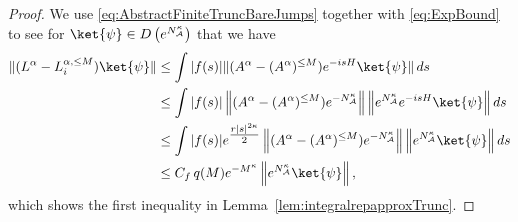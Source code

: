 \documentclass[11pt]{amsart}
\newcommand{\nn}{\nonumber}
\newcommand{\1}{\mathbbm{1}}
\newcommand{\NA}{N_{\mathcal{A}}}
\newcommand{\bin}[1]{}
\theoremstyle{plain}
\theoremstyle{definition}
\theoremstyle{remark}
\numberwithin{equation}{section}
\begin{document}
\begin{proof}

\bin{First of all note that for $i=1,\cdots, m$ we have that $N_i$ and $\NA$ commute from which we can easily see that
\begin{align}
\label{eq:NtotdomNi}
\left\|e^{\sqrt{N_i}}e^{-\NA^{\kappa}}\right\| = 1.
\end{align}}
 We use \eqref{eq:AbstractFiniteTruncBareJumps} together with \eqref{eq:ExpBound} to see for $\ket{\psi}\in D\left(e^{\NA^{\kappa}}\right)$ that we have
\begin{align}
\label{eq:NLLeqTrunc}
\nn\|(L^{\alpha}-L^{\alpha,\le M}_{i})\ket{\psi}\|
 \nn&\le \int |f(s)|\|(A^{\alpha}-(A^{\alpha})^{\le M})e^{-isH}\ket{\psi}\|\,ds\\&\nn\le  \int |f(s)| \left\|(A^{\alpha}-(A^{\alpha})^{\le M})e^{-\NA^{\kappa}}\right\|\left\|e^{\NA^{\kappa}}e^{-isH}\ket{\psi}\right\| ds\\&\nn\le  \int |f(s)| e^{\tfrac{r|s|^{2\kappa}}{2}}\left\|(A^{\alpha}-(A^{\alpha})^{\le M})e^{-\NA^{\kappa}}\right\|\left\|e^{\NA^{\kappa}}\ket{\psi}\right\| ds\\&\le C_f\,q(M)e^{-M^{\kappa}}\left\|e^{\NA^{\kappa}}\ket{\psi}\right\| ,
\end{align}
which shows the first inequality in Lemma~\ref{lem:integralrepapproxTrunc}. 


\bin{First, we use the estimates derived in Lemma \ref{lem.displaceblocks} to see for  $\ket{\psi}\in D(\NA+I)$, denoting $N_i:=a_i^\dagger a_i$, 
\begin{align*}
\|(\NA+I)\ket{\psi}\|^2&=\bra{\psi}\left(\sum_{j=1}^m N_j+I\right)^2\ket{\psi}\\
&\le m\sum_{j\in[m]}\bra{\psi}(N_j+I)^2\ket{\psi}\\
&=m\sum_{j\in[m]}\|(N_j+I)\ket{\psi}\|^2.
\end{align*}
Applying this bound to $\ket{\psi}=(a_i-(a^D_\alpha)_i)\ket{\varphi}$, we get
\begin{align*}
&\|(\NA+I)(a_i-(a^D_\alpha)_i)\ket{\varphi}\|^2\\
&\quad \le m\,\sum_{j\ne i}4|\alpha|^2\|(N_j+I)(N_i+I)\ket{\varphi}\|^2\\
&\quad + 25m |\alpha|^2\|(N_i+I)^2\ket{\varphi}\|^2\\
&\quad \le 25m^2|\alpha|^2\sum_{j\in[m]}\,\|(N_j+I)^2\ket{\varphi}\|^2\\
&\quad \le 25m^3|\alpha|^2\|(\NA+I)^2\ket{\varphi}\|^2.
\end{align*}



}
\end{proof}
\end{document}
